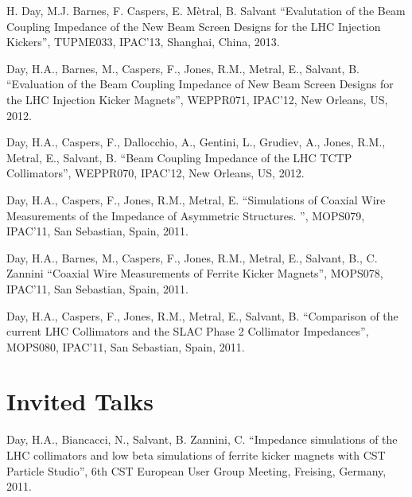 \documentclass[margin,line]{resume}
\begin{document}
\begin{resume}
	H. Day, M.J. Barnes, F. Caspers, E. Mètral, B. Salvant
    ``Evalutation of the Beam Coupling Impedance of the New Beam Screen Designs for the LHC Injection Kickers'',
    TUPME033, IPAC'13, Shanghai, China, 2013.

\vspace{-2mm}

	Day, H.A., Barnes, M., Caspers, F., Jones, R.M., Metral, E., Salvant, B.
    ``Evaluation of the Beam Coupling Impedance of New Beam Screen Designs for the LHC Injection Kicker Magnets'',
    WEPPR071, IPAC'12, New Orleans, US, 2012.

\vspace{-2mm}

	Day, H.A., Caspers, F., Dallocchio, A., Gentini, L., Grudiev, A., Jones, R.M., Metral, E., Salvant, B.
    ``Beam Coupling Impedance of the LHC TCTP Collimators'',
    WEPPR070, IPAC'12, New Orleans, US, 2012.

\vspace{-2mm}

	Day, H.A., Caspers, F., Jones, R.M., Metral, E.
    ``Simulations of Coaxial Wire Measurements of the Impedance of Asymmetric Structures. '',
    MOPS079, IPAC'11, San Sebastian, Spain, 2011.

\vspace{-2mm}

	Day, H.A., Barnes, M., Caspers, F., Jones, R.M., Metral, E., Salvant, B., C. Zannini
    ``Coaxial Wire Measurements of Ferrite Kicker Magnets'',
    MOPS078, IPAC'11, San Sebastian, Spain, 2011.

\vspace{-2mm}

	Day, H.A., Caspers, F., Jones, R.M., Metral, E., Salvant, B.
    ``Comparison of the current LHC Collimators and the SLAC Phase 2 Collimator Impedances'',
    MOPS080, IPAC'11, San Sebastian, Spain, 2011.

    \section{\mysidestyle Invited Talks}

	Day, H.A., Biancacci, N., Salvant, B. Zannini, C.
    ``Impedance simulations of the LHC collimators and low beta simulations of ferrite kicker magnets with CST Particle Studio'',
    6th CST European User Group Meeting, Freising, Germany, 2011.


\end{resume}
\end{document}
